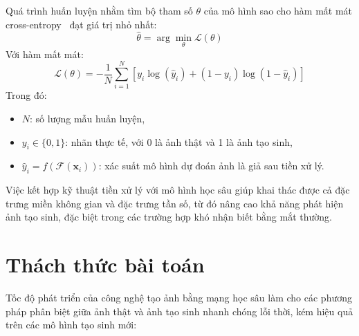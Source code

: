 Quá trình huấn luyện nhằm tìm bộ tham số \( \theta \) của mô hình sao cho hàm mất mát cross-entropy~\cite{2023arXiv230407288M} đạt giá trị nhỏ nhất:
\[
\hat{\theta} = \arg \min_{\theta} \mathcal{L}(\theta)
\]
Với hàm mất mát:
\[
\mathcal{L}(\theta) = -\frac{1}{N} \sum_{i=1}^{N} \left[ y_i \log(\hat{y}_i) + (1 - y_i) \log(1 - \hat{y}_i) \right]
\]
Trong đó:
\begin{itemize}
	\item \( N \): số lượng mẫu huấn luyện,
	\item \( y_i \in \{0, 1\} \): nhãn thực tế, với 0 là ảnh thật và 1 là ảnh tạo sinh,
	\item \( \hat{y}_i = f(\mathcal{F}(\mathbf{x}_i)) \): xác suất mô hình dự đoán ảnh là giả sau tiền xử lý.
\end{itemize}

Việc kết hợp kỹ thuật tiền xử lý với mô hình học sâu giúp khai thác được cả đặc trưng miền không gian và đặc trưng tần số, từ đó nâng cao khả năng phát hiện ảnh tạo sinh, đặc biệt trong các trường hợp khó nhận biết bằng mắt thường.

%
\section{Thách thức bài toán}

Tốc độ phát triển của công nghệ tạo ảnh bằng mạng học sâu làm cho các phương pháp phân biệt giữa ảnh thật và ảnh tạo sinh nhanh chóng lỗi thời, kém hiệu quả trên các mô hình tạo sinh mới:

